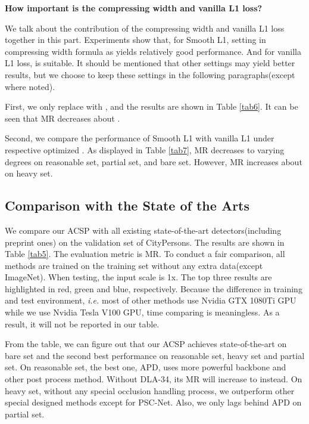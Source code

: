 \documentclass[twocolumn]{article}
\begin{document}
\textbf{How important is the compressing width and vanilla L1 loss?}\par 
We talk about the contribution of the compressing width and vanilla L1 loss together in this part. Experiments show that, for Smooth L1, setting  in compressing width formula as  yields relatively good performance. And for vanilla L1 loss,  is suitable. It should be mentioned that other settings may yield better results, but we choose to keep these settings in the following paragraphs(except where noted).\par 
First, we only replace  with , and the results are shown in Table \ref{tab6}. It can be seen that MR decreases about .\par 
Second, we compare the performance of Smooth L1 with vanilla L1 under respective optimized . As displayed in Table \ref{tab7}, MR decreases to varying degrees on reasonable set, partial set, and bare set. However, MR increases about  on heavy set. \par 




\subsection{Comparison with the State of the Arts}
We compare our ACSP with all existing state-of-the-art detectors(including preprint ones) on the validation set of CityPersons. The results are shown in Table \ref{tab5}. The evaluation metric is MR. To conduct a fair comparison, all methods are trained on the training set without any extra data(except ImageNet). When testing, the input scale is 1x. The top three results are highlighted in red, green and blue, respectively. Because the difference in training and test environment, \textit{i.e.} most of other methods use Nvidia GTX 1080Ti GPU while we use Nvidia Tesla V100 GPU, time comparing is meaningless. As a result, it will not be reported in our table.\par 
From the table, we can figure out that our ACSP achieves state-of-the-art on bare set and the second best performance on reasonable set, heavy set and partial set. On reasonable set, the best one, APD\cite{DBLP:journals/corr/abs-1910-09188}, uses more powerful backbone and other post process method. Without DLA-34, its MR will increase to  instead. On heavy set, without any special occlusion handling process, we outperform other special designed methods except for PSC-Net\cite{xie2020psc}. Also, we only lags behind APD\cite{DBLP:journals/corr/abs-1910-09188} on partial set.
\end{document}
